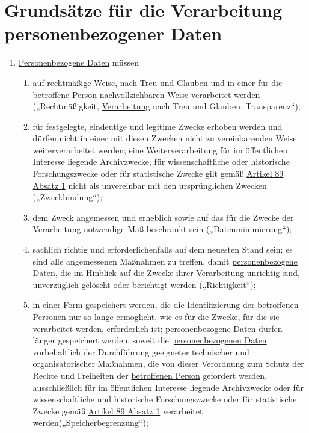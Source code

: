 \chapter{Grundsätze für die Verarbeitung personenbezogener Daten}
\label{ch:5}


\begin{enumerate}

  \item \hyperref[itm:04-1]{Personenbezogene Daten} müssen
  \label{itm:05-1}

  \begin{enumerate}
  
    \item auf rechtmäßige Weise, nach Treu und Glauben und in einer für die \hyperref[itm:04-1]{betroffene Person} nachvollziehbaren Weise
     verarbeitet werden („Rechtmäßigkeit, \hyperref[itm:04-2]{Verarbeitung} nach Treu und Glauben, Transparenz“);
    \label{itm:05-1a}

    \item für festgelegte, eindeutige und legitime Zwecke erhoben werden und dürfen nicht in einer mit diesen Zwecken
     nicht zu vereinbarenden Weise weiterverarbeitet werden; eine Weiterverarbeitung für im öffentlichen Interesse
     liegende Archivzwecke, für wissenschaftliche oder historische Forschungszwecke oder für statistische Zwecke gilt
     gemäß \hyperref[itm:89-1]{Artikel 89 Absatz 1} nicht als unvereinbar mit den ursprünglichen
     Zwecken („Zweckbindung“);
    \label{itm:05-1b}

    \item dem Zweck angemessen und erheblich sowie auf das für die Zwecke der \hyperref[itm:04-2]{Verarbeitung} notwendige Maß beschränkt
     sein („Datenminimierung“);
    \label{itm:05-1c}

    \item sachlich richtig und erforderlichenfalls auf dem neuesten Stand sein; es sind alle angemessenen Maßnahmen zu
     treffen, damit \hyperref[itm:04-1]{personenbezogene Daten}, die im Hinblick auf die Zwecke ihrer \hyperref[itm:04-2]{Verarbeitung} unrichtig sind,
     unverzüglich gelöscht oder berichtigt werden („Richtigkeit“);
    \label{itm:05-1d}

    \item in einer Form gespeichert werden, die die Identifizierung der \hyperref[itm:04-1]{betroffenen Personen} nur so lange ermöglicht,
     wie es für die Zwecke, für die sie verarbeitet werden, erforderlich ist; \hyperref[itm:04-1]{personenbezogene Daten} dürfen länger
     gespeichert werden, soweit die \hyperref[itm:04-1]{personenbezogenen Daten} vorbehaltlich der Durchführung geeigneter technischer und
     organisatorischer Maßnahmen, die von dieser Verordnung zum Schutz der Rechte und Freiheiten der \hyperref[itm:04-1]{betroffenen Person}
     gefordert werden, ausschließlich für im öffentlichen Interesse liegende Archivzwecke oder für wissenschaftliche
     und historische Forschungszwecke oder für statistische Zwecke gemäß \hyperref[itm:89-1]{Artikel 89 Absatz 1}
     verarbeitet werden(„Speicherbegrenzung“);
    \label{itm:05-1e}


\end{enumerate}
\end{enumerate}
